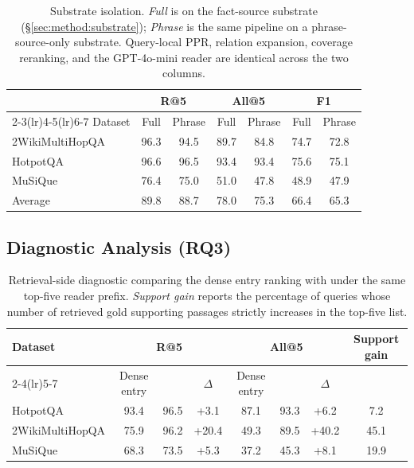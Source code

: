 \begin{table}[t]
\centering
\small
\setlength{\tabcolsep}{3pt}
\begin{tabular}{lccc ccc}
\toprule
& \multicolumn{2}{c}{R@5} & \multicolumn{2}{c}{All@5} & \multicolumn{2}{c}{F1} \\
\cmidrule(lr){2-3}\cmidrule(lr){4-5}\cmidrule(lr){6-7}
Dataset & Full & Phrase & Full & Phrase & Full & Phrase \\
\midrule
2WikiMultiHopQA & 96.3 & 94.5 & 89.7 & 84.8 & 74.7 & 72.8 \\
HotpotQA        & 96.6 & 96.5 & 93.4 & 93.4 & 75.6 & 75.1 \\
MuSiQue         & 76.4 & 75.0 & 51.0 & 47.8 & 48.9 & 47.9 \\
\midrule
Average         & 89.8 & 88.7 & 78.0 & 75.3 & 66.4 & 65.3 \\
\bottomrule
\end{tabular}
\caption{Substrate isolation. \emph{Full} is \methodname{} on the
fact-source substrate (\S\ref{sec:method:substrate}); \emph{Phrase} is
the same pipeline on a phrase-source-only substrate. Query-local PPR,
relation expansion, coverage reranking, and the GPT-4o-mini reader
are identical across the two columns.}
\label{tab:substrate-iso}
\end{table}

\subsection{Diagnostic Analysis (RQ3)}
\label{sec:experiments:analysis}

\begin{table}[t]
\centering
\small
\setlength{\tabcolsep}{4pt}
\begin{tabular}{lccc ccc c}
\toprule
Dataset & \multicolumn{3}{c}{R@5} &
\multicolumn{3}{c}{All@5} &
Support gain \\
\cmidrule(lr){2-4}\cmidrule(lr){5-7}
& Dense entry & \methodname{} & $\Delta$ &
Dense entry & \methodname{} & $\Delta$ & \\
\midrule
HotpotQA & 93.4 & 96.5 & +3.1 & 87.1 & 93.3 & +6.2 & 7.2 \\
2WikiMultiHopQA & 75.9 & 96.2 & +20.4 & 49.3 & 89.5 & +40.2 & 45.1 \\
MuSiQue & 68.3 & 73.5 & +5.3 & 37.2 & 45.3 & +8.1 & 19.9 \\
\bottomrule
\end{tabular}
\caption{Retrieval-side diagnostic comparing the dense entry ranking
with \methodname{} under the same top-five reader prefix.
\emph{Support gain} reports the percentage of queries whose number of
retrieved gold supporting passages strictly increases in the top-five
list.}
\label{tab:flow-diagnostic}
\end{table}

